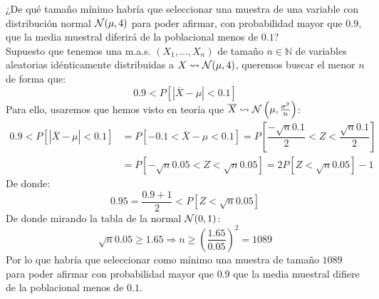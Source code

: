 \begin{ejercicio}
    ¿De qué tamaño mínimo habría que seleccionar una muestra de una variable con distribución normal $\mathcal{N}(\mu, 4)$ para poder afirmar, con probabilidad mayor que $0.9$, que la media muestral diferirá de la poblacional menos de $0.1$?\\

    \noindent
    Supuesto que tenemos una m.a.s. $(X_1, \ldots, X_n)$ de tamaño $n\in \mathbb{N}$ de variables aleatorias idénticamente distribuidas a $X\rightsquigarrow\mathcal{N}(\mu, 4)$, queremos buscar el menor $n$ de forma que:
    \begin{equation*}
        0.9 < P\left[|\overline{X}-\mu| < 0.1\right]
    \end{equation*}
    Para ello, usaremos que hemos visto en teoría que $\overline{X}\rightsquigarrow\mathcal{N}\left(\mu, \frac{\sigma^2}{n}\right)$:
    \begin{align*}
        0.9 < P[|\overline{X}-\mu| < 0.1] &= P[-0.1 < \overline{X}-\mu < 0.1] = P\left[\dfrac{-\sqrt{n}0.1}{2} < Z < \dfrac{\sqrt{n}0.1}{2}\right] \\ 
                                             &= P\left[-\sqrt{n}0.05 < Z<\sqrt{n}0.05\right] = 2P\left[Z<\sqrt{n}0.05\right] - 1 
    \end{align*}
    De donde:
    \begin{equation*}
        0.95 = \dfrac{0.9+1}{2} < P[Z<\sqrt{n}0.05]
    \end{equation*}
    De donde mirando la tabla de la normal $\mathcal{N}(0,1)$:
    \begin{equation*}
        \sqrt{n}0.05 \geq 1.65 \Longrightarrow n \geq {\left(\dfrac{1.65}{0.05}\right)}^{2} = 1089
    \end{equation*}
    Por lo que habría que seleccionar como mínimo una muestra de tamaño $1089$ para poder afirmar con probabilidad mayor que $0.9$ que la media muestral difiere de la poblacional menos de $0.1$.
\end{ejercicio}

